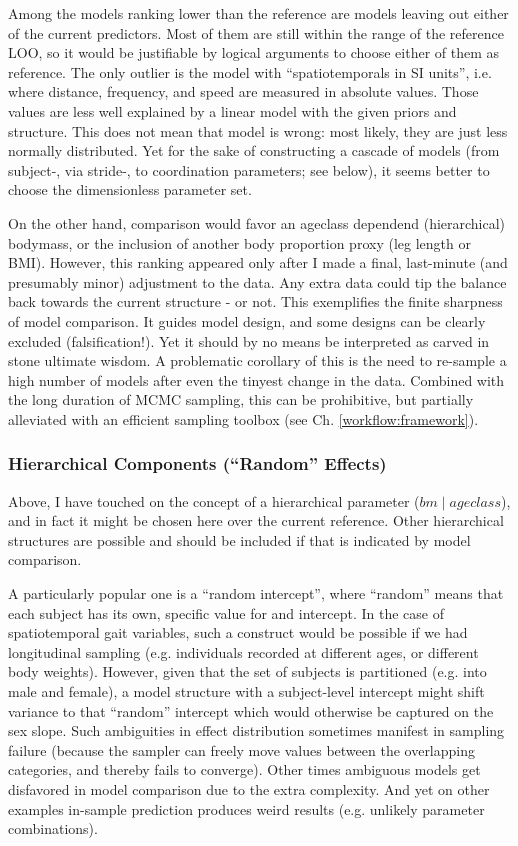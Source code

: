 Among the models ranking lower than the reference are models leaving out either of the current predictors.
Most of them are still within the range of the reference LOO, so it would be justifiable by logical arguments to choose either of them as reference.
The only outlier is the model with ``spatiotemporals in SI units'', i.e. where distance, frequency, and speed are measured in absolute values.
Those values are less well explained by a linear model with the given priors and structure.
This does not mean that model is wrong: most likely, they are just less normally distributed.
Yet for the sake of constructing a cascade of models (from subject-, via stride-, to coordination parameters; see below), it seems better to choose the dimensionless parameter set.


On the other hand, comparison would favor an ageclass dependend (hierarchical) bodymass, or the inclusion of another body proportion proxy (leg length or BMI).
However, this ranking appeared only after I made a final, last-minute (and presumably minor) adjustment to the data.
Any extra data could tip the balance back towards the current structure - or not.
This exemplifies the finite sharpness of model comparison.
It guides model design, and some designs can be clearly excluded (falsification!).
Yet it should by no means be interpreted as carved in stone ultimate wisdom.
A problematic corollary of this is the need to re-sample a high number of models after even the tinyest change in the data.
Combined with the long duration of MCMC sampling, this can be prohibitive, but partially alleviated with an efficient sampling toolbox (see Ch. \ref{workflow:framework}).


\subsubsection{Hierarchical Components (``Random'' Effects)}
\label{sec:org86c8327}
Above, I have touched on the concept of a hierarchical parameter (\(bm\mid ageclass\)), and in fact it might be chosen here over the current reference.
Other hierarchical structures are possible and should be included if that is indicated by model comparison.

A particularly popular one is a ``random intercept'', where ``random'' means that each subject has its own, specific value for and intercept.
In the case of spatiotemporal gait variables, such a construct would be possible if we had longitudinal sampling (e.g. individuals recorded at different ages, or different body weights).
However, given that the set of subjects is partitioned (e.g. into male and female), a model structure with a subject-level intercept might shift variance to that ``random'' intercept which would otherwise be captured on the sex slope.
Such ambiguities in effect distribution sometimes manifest in sampling failure (because the sampler can freely move values between the overlapping categories, and thereby fails to converge).
Other times ambiguous models get disfavored in model comparison due to the extra complexity.
And yet on other examples in-sample prediction produces weird results (e.g. unlikely parameter combinations).

